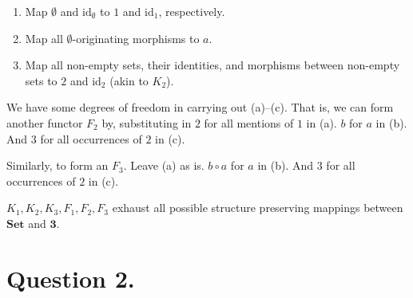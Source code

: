 \documentclass{article}
\begin{document}
\begin{enumerate}[label=(\alph*)]

\item Map $\emptyset$ and $\textrm{id}_{\emptyset}$ to $1$ and $\textrm{id}_1$, respectively.

\item Map all $\emptyset$-originating morphisms to $a$.

\item Map all non-empty sets, their identities, and morphisms between non-empty sets to $2$ and $\textrm{id}_2$ (akin to $K_2$).

\end{enumerate}

We have some degrees of freedom in carrying out (a)–(c). That is, we can form another functor $F_2$ by, substituting in $2$ for all mentions of $1$ in (a). $b$ for $a$ in (b). And $3$ for all occurrences of $2$ in (c).

Similarly, to form an $F_3$. Leave (a) as is. $b \circ a$ for $a$ in (b). And $3$ for all occurrences of $2$ in (c).

$K_1, K_2, K_3, F_1, F_2, F_3$ exhaust all possible structure preserving mappings between $\textbf{Set}$ and $\textbf{3}$.

\section*{Question 2.}
\end{document}
